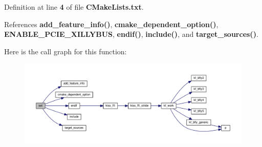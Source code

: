 Definition at line {\bf 4} of file {\bf C\+Make\+Lists.\+txt}.



References {\bf add\+\_\+feature\+\_\+info()}, {\bf cmake\+\_\+dependent\+\_\+option()}, {\bf E\+N\+A\+B\+L\+E\+\_\+\+P\+C\+I\+E\+\_\+\+X\+I\+L\+L\+Y\+B\+US}, {\bf endif()}, {\bf include()}, and {\bf target\+\_\+sources()}.



Here is the call graph for this function\+:
\nopagebreak
\begin{figure}[H]
\begin{center}
\leavevmode
\includegraphics[width=350pt]{de/d02/limesuite-dev_2src_2ConnectionXillybus_2CMakeLists_8txt_a23a8fb2995b6044e7e2e68ed33622f5d_cgraph}
\end{center}
\end{figure}



